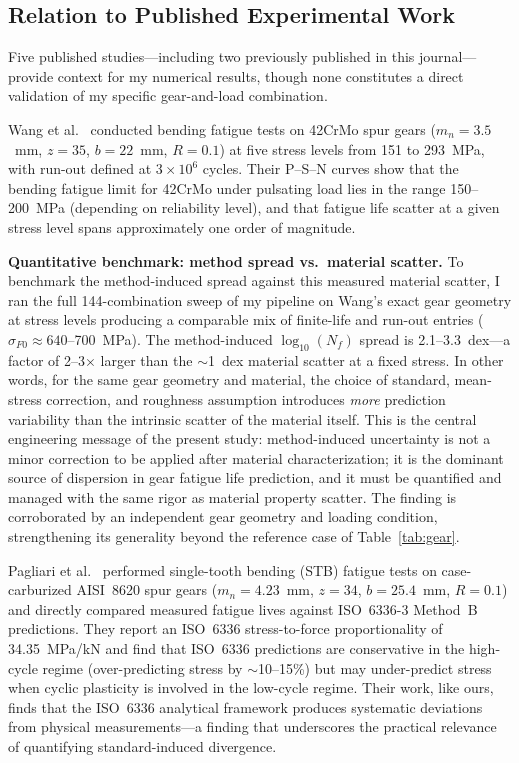 \documentclass[12pt,a4paper]{article}
\begin{document}
\subsection{Relation to Published Experimental Work}

Five published studies---including two previously published in
this journal---provide context for my numerical results, though
none constitutes a direct validation of my specific
gear-and-load combination.

Wang et al.~\cite{wang2023} conducted bending fatigue tests on 42CrMo
spur gears ($m_n{=}3.5$~mm, $z{=}35$, $b{=}22$~mm, $R{=}0.1$) at five
stress levels from 151 to 293~MPa, with run-out defined at $3\times10^6$
cycles. Their P--S--N curves show that the bending fatigue limit for
42CrMo under pulsating load lies in the range 150--200~MPa (depending on
reliability level), and that fatigue life scatter at a given stress level
spans approximately one order of magnitude.

\medskip
\noindent\textbf{Quantitative benchmark: method spread vs.\ material scatter.}
To benchmark the method-induced spread against this measured material
scatter, I ran the full 144-combination sweep of my pipeline on Wang's
exact gear geometry at stress levels producing a comparable mix of
finite-life and run-out entries ($\sigma_{F0} \approx 640$--700~MPa).
The method-induced $\log_{10}(N_f)$ spread is 2.1--3.3~dex---a factor
of 2--3$\times$ larger than the $\sim$1~dex material scatter at a
fixed stress. In other words, for the same gear geometry and material,
the choice of standard, mean-stress correction, and roughness
assumption introduces \emph{more} prediction variability than the
intrinsic scatter of the material itself. This is the central
engineering message of the present study: method-induced uncertainty
is not a minor correction to be applied after material characterization;
it is the dominant source of dispersion in gear fatigue life prediction,
and it must be quantified and managed with the same rigor as material
property scatter. The finding is corroborated by an independent gear
geometry and loading condition, strengthening its generality beyond
the reference case of Table~\ref{tab:gear}.

Pagliari et al.~\cite{pagliari2025} performed single-tooth bending (STB)
fatigue tests on case-carburized AISI~8620 spur gears
($m_n{=}4.23$~mm, $z{=}34$, $b{=}25.4$~mm, $R{=}0.1$) and directly
compared measured fatigue lives against ISO~6336-3 Method~B predictions.
They report an ISO~6336 stress-to-force proportionality of
34.35~MPa/kN and find that ISO~6336 predictions are conservative in the
high-cycle regime (over-predicting stress by $\sim$10--15\%) but may
under-predict stress when cyclic plasticity is involved in the low-cycle
regime. Their work, like ours, finds that the ISO~6336 analytical
framework produces systematic deviations from physical measurements---a
finding that underscores the practical relevance of quantifying
standard-induced divergence.
\end{document}
